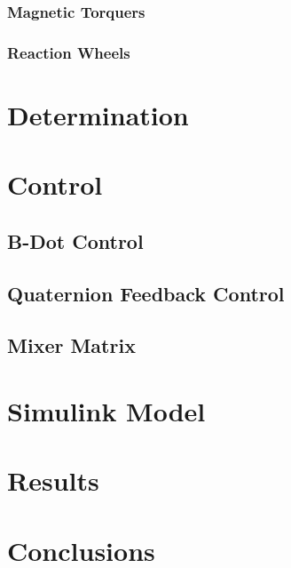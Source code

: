 \documentclass[11pt,a4paper]{report}
\begin{document}
\subsection{Magnetic Torquers}
\subsection{Reaction Wheels}

\chapter{Determination}

\chapter{Control}
\section{B-Dot Control}
\section{Quaternion Feedback Control}
\section{Mixer Matrix}

\chapter{Simulink Model}

\chapter{Results}

\chapter{Conclusions}

\newpage
\end{document}
